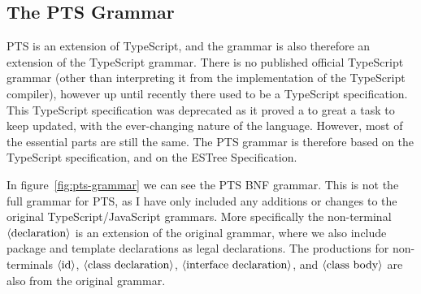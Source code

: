 \subsection{The PTS Grammar}\label{subsec:the-pts-grammar}

PTS is an extension of TypeScript, and the grammar is also therefore an extension of the TypeScript grammar.
There is no published official TypeScript grammar (other than interpreting it from the implementation of the TypeScript compiler), however up until recently there used to be a TypeScript specification\cite{tsspec}.
This TypeScript specification was deprecated as it proved a to great a task to keep updated, with the ever-changing nature of the language.
However, most of the essential parts are still the same.
The PTS grammar is therefore based on the TypeScript specification, and on the ESTree Specification\cite{estreespec}.

In figure~\vref{fig:pts-grammar} we can see the PTS BNF grammar.
This is not the full grammar for PTS, as I have only included any additions or changes to the original TypeScript/JavaScript grammars.
More specifically the non-terminal $\langle \textrm{declaration} \rangle$ is an extension of the original grammar, where we also include package and template declarations as legal declarations.
The productions for non-terminals $\langle \textrm{id} \rangle$, $\langle \textrm{class declaration} \rangle$, $\langle \textrm{interface declaration} \rangle$, and $\langle \textrm{class body} \rangle$ are also from the original grammar.



